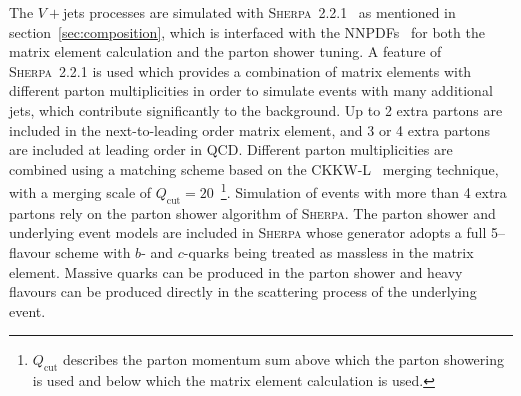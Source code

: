 The $V+$jets processes are simulated with
\textsc{Sherpa}~2.2.1~\cite{1126-6708-2009-02-007} as mentioned in
section~\ref{sec:composition}, which is interfaced with the
NNPDFs~\cite{Ball:2012cx} for both the matrix element calculation and the parton
shower tuning. A feature of \textsc{Sherpa}~2.2.1 is used which provides a
combination of matrix elements with different parton multiplicities in order to
simulate events with many additional jets, which contribute significantly to the
background. Up to 2 extra partons are included in the next-to-leading order
matrix element, and 3 or 4 extra partons are included at leading order in QCD.
Different parton multiplicities are combined using  a matching scheme based on
the CKKW-L~\cite{Lonnblad:2001iq, Lavesson:2005xu} merging technique, with a
merging scale of $Q_{\text{cut}}=20$~\GeV\footnote{$Q_{\text{cut}}$ describes
  the parton momentum sum above which the parton showering is used and below which
  the matrix element calculation is used.}. Simulation of events with more than 4
extra partons rely on the parton shower algorithm of \textsc{Sherpa}. The parton
shower and underlying event models are included in \textsc{Sherpa} whose
generator adopts a full 5--flavour scheme with $b$- and $c$-quarks being treated
as massless in the matrix element. Massive quarks can be produced in the parton
shower and heavy flavours can be produced directly in the scattering process of
the underlying event.

